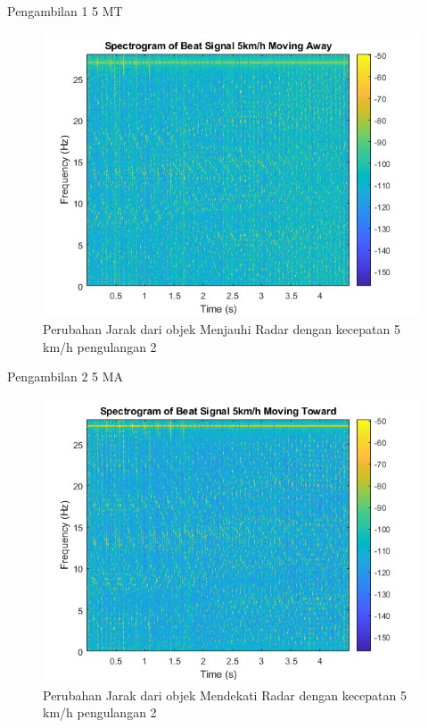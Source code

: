 Pengambilan 1 5 MT

\begin{figure}
	\centering
	\includegraphics[scale=0.6]{pics/bab5/Velocity/2_5MA.jpg}
	\caption{Perubahan Jarak dari objek Menjauhi Radar dengan kecepatan 5 km/h pengulangan 2}
	\label{fig:pengambilan2_5MA}
\end{figure}

Pengambilan 2 5 MA

\begin{figure}
	\centering
	\includegraphics[scale=0.6]{pics/bab5/Velocity/2_5MT.jpg}
	\caption{Perubahan Jarak dari objek Mendekati Radar dengan kecepatan 5 km/h pengulangan 2}
	\label{fig:pengambilan2_5MT}
\end{figure}

